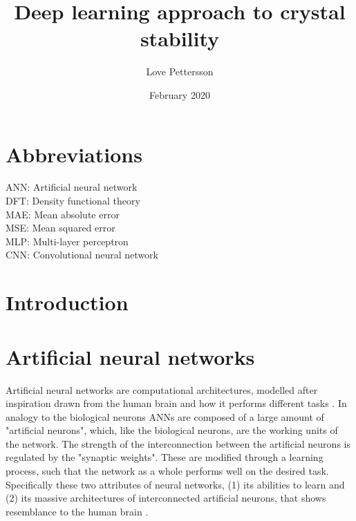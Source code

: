 \documentclass{article}
\title{Deep learning approach to crystal stability}
\author{Love Pettersson }
\date{February 2020}
\begin{document}
\maketitle
\newpage
\section{Abbreviations}
ANN: Artificial neural network \\
DFT: Density functional theory \\
MAE: Mean absolute error \\
MSE: Mean squared error \\
MLP: Multi-layer perceptron \\
CNN: Convolutional neural network

\newpage
\section{Introduction}


\section{Artificial neural networks}
Artificial neural networks are computational architectures, modelled after inspiration drawn from the human brain and how it performs different tasks \cite{McCulloch1943}. In analogy to the biological neurons ANNs are composed of a large amount of "artificial neurons", which, like the biological neurons, are the working units of the network. The strength of the interconnection between the artificial neurons is regulated by the "synaptic weights". These are modified through a learning process, such that the network as a whole performs well on the desired task. Specifically these two attributes of neural networks, (1) its abilities to learn and (2) its massive architectures of interconnected artificial neurons, that shows resemblance to the human brain \cite{Simonhaykin}.\\


 
\end{document}
